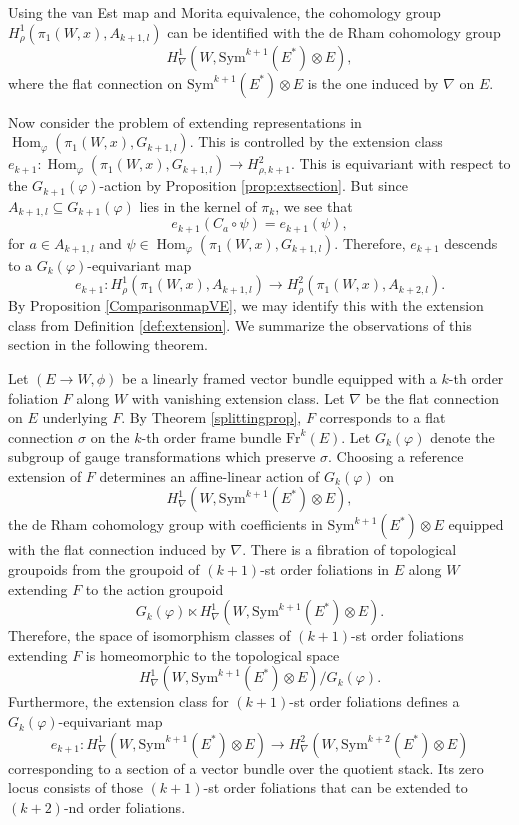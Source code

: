 \documentclass[10pt]{amsart}
\newcommand{\Hom}{\operatorname{Hom}}
\numberwithin{theoremalpha}{section}
\numberwithin{equation}{section}
\numberwithin{definition}{section}
\numberwithin{theorem}{section}
\numberwithin{proposition}{section}
\numberwithin{lemma}{section}
\numberwithin{example}{section}
\numberwithin{remark}{section}
\numberwithin{corollary}{section}
\numberwithin{question}{section}
\numberwithin{problem}{section}
\numberwithin{assumption}{section}
\theoremstyle{named}
\numberwithin{equation}{section}
\begin{document}
Using the van Est map and Morita equivalence, the cohomology group $H_{\rho}^1(\pi_{1}(W,x), A_{k+1,l})$ can be identified with the de Rham cohomology group 
\[
H_{\nabla}^1(W, \mathrm{Sym}^{k+1}(E^*)\otimes E),
\]
where the flat connection on $\mathrm{Sym}^{k+1}(E^*)\otimes E$ is the one induced by $\nabla$ on $E$. 

Now consider the problem of extending representations in $ \Hom_{\varphi}(\pi_1(W, x), G_{k+1,l})$. This is controlled by the extension class $e_{k+1} : \Hom_{\varphi}(\pi_1(W, x), G_{k+1,l}) \to H^2_{\rho,k+1}$. This is equivariant with respect to the $G_{k+1}(\varphi)$-action by Proposition \ref{prop:extsection}. But since $A_{k+1, l} \subseteq G_{k+1}(\varphi)$ lies in the kernel of $\pi_{k}$, we see that
\[
e_{k+1}(C_{a} \circ \psi) = e_{k+1}(\psi),
\]
for $a \in A_{k+1,l}$ and $\psi \in \Hom_{\varphi}(\pi_1(W, x), G_{k+1,l})$. Therefore, $e_{k+1}$ descends to a $G_{k}(\varphi)$-equivariant map 
\[
e_{k+1} : H_{\rho}^1(\pi_{1}(W,x), A_{k+1,l}) \to H_{\rho}^2(\pi_1(W,x),A_{k+2,l}).
\]
By Proposition \ref{ComparisonmapVE}, we may identify this with the extension class from Definition \ref{def:extension}. We summarize the observations of this section in the following theorem. 

\begin{theorem} \label{thm:extensionspacegroupoid}
Let $(E \to W, \phi)$ be a linearly framed vector bundle equipped with a $k$-th order foliation $F$ along $W$ with vanishing extension class. Let $\nabla$ be the  flat connection on $E$ underlying $F$. By Theorem \ref{splittingprop}, $F$ corresponds to a flat connection $\sigma$ on the $k$-th order frame bundle $\mathrm{Fr}^{k}(E)$. Let $G_{k}(\varphi)$ denote the subgroup of gauge transformations which preserve $\sigma$. Choosing a reference extension of $F$ determines an affine-linear action of $G_{k}(\varphi)$ on
\[
H_{\nabla}^1(W, \mathrm{Sym}^{k+1}(E^*)\otimes E),
\]
the de Rham cohomology group with coefficients in $\mathrm{Sym}^{k+1}(E^*)\otimes E$ equipped with the flat connection induced by $\nabla$. There is a fibration of topological groupoids from the groupoid of $(k+1)$-st order foliations in $E$ along $W$ extending $F$ to the action groupoid 
\[
G_{k}(\varphi) \ltimes H_{\nabla}^1(W, \mathrm{Sym}^{k+1}(E^*)\otimes E). 
\]
Therefore, the space of isomorphism classes of $(k+1)$-st order foliations extending $F$ is homeomorphic to the topological space 
\[
H_{\nabla}^1(W, \mathrm{Sym}^{k+1}(E^*)\otimes E)/G_{k}(\varphi). 
\]
Furthermore, the extension class for $(k+1)$-st order foliations defines a $G_{k}(\varphi)$-equivariant map 
\[
e_{k+1} : H_{\nabla}^1(W, \mathrm{Sym}^{k+1}(E^*)\otimes E) \to H_{\nabla}^2(W, \mathrm{Sym}^{k+2}(E^*)\otimes E) 
\]
corresponding to a section of a vector bundle over the quotient stack. Its zero locus consists of those $(k+1)$-st order foliations that can be extended to $(k+2)$-nd order foliations.
\end{theorem}
\end{document}

